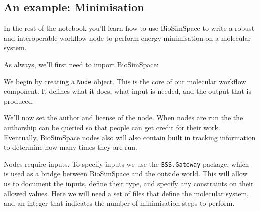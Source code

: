 \hypertarget{an-example-minimisation}{%
\subsection{An example: Minimisation}\label{an-example-minimisation}}

In the rest of the notebook you'll learn how to use BioSimSpace to write
a robust and interoperable workflow node to perform energy minimisation
on a molecular system.

As always, we'll first need to import BioSimSpace:

\begin{Shaded}
\begin{Highlighting}[]
\end{Highlighting}
\end{Shaded}

We begin by creating a \texttt{Node} object. This is the core of our
molecular workflow component. It defines what it does, what input is
needed, and the output that is produced.

\begin{Shaded}
\begin{Highlighting}[]
\OperatorTok{=}\NormalTok{)}
\end{Highlighting}
\end{Shaded}

We'll now set the author and license of the node. When nodes are run the
the authorship can be queried so that people can get credit for their
work. Eventually, BioSimSpace nodes also will also contain built in
tracking information to determine how many times they are run.

\begin{Shaded}
\begin{Highlighting}[]
\OperatorTok{=}\OperatorTok{=}\OperatorTok{=}\NormalTok{)}
\NormalTok{)}
\end{Highlighting}
\end{Shaded}

Nodes require inputs. To specify inputs we use the \texttt{BSS.Gateway}
package, which is used as a bridge between BioSimSpace and the outside
world. This will allow us to document the inputs, define their type, and
specify any constraints on their allowed values. Here we will need a set
of files that define the molecular system, and an integer that indicates
the number of minimisation steps to perform.

